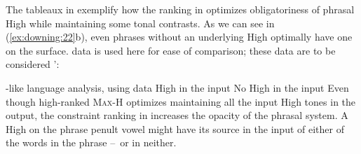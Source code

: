 \documentclass[output=paper
,newtxmath
,modfonts
,nonflat]{../langsci/langscibook}
\begin{document}
The tableaux in  exemplify how the ranking in  optimizes obligatoriness of phrasal High  while maintaining some tonal contrasts. As we can see in (\ref{ex:downing:22}b), even phrases without an underlying High  optimally have one on the surface.  data is used here for ease of comparison; these data are to be considered ’:


\ea\label{ex:downing:22}-like language analysis, using  data
\ea\label{ex:downing:22a} High  in the input
\sn
\ex\label{ex:downing:22b}No High  in the input 
\z
\z
Even though high-ranked \textsc{Max-H} optimizes maintaining all the input High tones in the output, the constraint ranking in  increases the opacity of the phrasal  system. A High  on the phrase penult vowel might have its source in the input of either of the words in the phrase –~or in neither.
\end{document}
